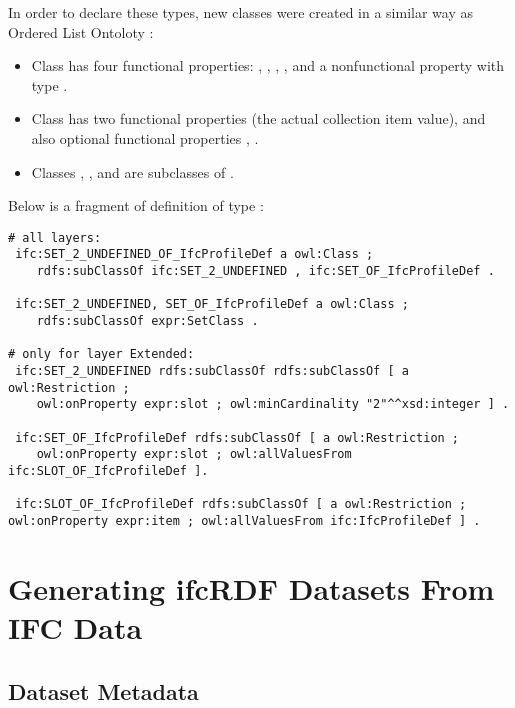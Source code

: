 In order to declare these types, new classes were created in a similar way as Ordered List Ontoloty \cite{olo:ontology}:
\begin{itemize}
\item Class  has four functional properties: , , , ,  and a nonfunctional property  with type .
\item Class  has two functional properties  (the actual collection item value),  and also optional functional properties , .
\item Classes , ,  and  are subclasses of .
\end{itemize}

Below is a fragment of definition of type :

\begin{lstlisting}
# all layers:
 ifc:SET_2_UNDEFINED_OF_IfcProfileDef a owl:Class ;
    rdfs:subClassOf ifc:SET_2_UNDEFINED , ifc:SET_OF_IfcProfileDef .
    
 ifc:SET_2_UNDEFINED, SET_OF_IfcProfileDef a owl:Class ;
    rdfs:subClassOf expr:SetClass .

# only for layer Extended:
 ifc:SET_2_UNDEFINED rdfs:subClassOf rdfs:subClassOf [ a owl:Restriction ;
    owl:onProperty expr:slot ; owl:minCardinality "2"^^xsd:integer ] .
    
 ifc:SET_OF_IfcProfileDef rdfs:subClassOf [ a owl:Restriction ;
    owl:onProperty expr:slot ; owl:allValuesFrom ifc:SLOT_OF_IfcProfileDef ].

 ifc:SLOT_OF_IfcProfileDef rdfs:subClassOf [ a owl:Restriction ; owl:onProperty expr:item ; owl:allValuesFrom ifc:IfcProfileDef ] .
\end{lstlisting}



\section{Generating ifcRDF Datasets From IFC Data}
\label{sec:ifcRDF}

\subsection{Dataset Metadata}
\label{subsec:ifcRDF-metadata}

